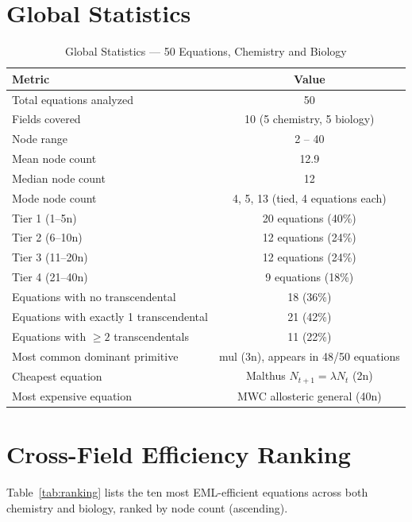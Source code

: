 \documentclass[12pt,a4paper]{article}
\theoremstyle{definition}
\begin{document}
\section{Global Statistics}
\label{sec:stats}

\begin{table}[ht]
\centering
\caption{Global Statistics --- 50 Equations, Chemistry and Biology}
\label{tab:stats}
\begin{tabular}{lc}
\toprule
\textbf{Metric} & \textbf{Value} \\
\midrule
Total equations analyzed & 50 \\
Fields covered & 10 (5 chemistry, 5 biology) \\
Node range & 2 -- 40 \\
Mean node count & 12.9 \\
Median node count & 12 \\
Mode node count & 4, 5, 13 (tied, 4 equations each) \\
Tier 1 (1--5n) & 20 equations (40\%) \\
Tier 2 (6--10n) & 12 equations (24\%) \\
Tier 3 (11--20n) & 12 equations (24\%) \\
Tier 4 (21--40n) & 9 equations (18\%) \\
\midrule
Equations with no transcendental & 18 (36\%) \\
Equations with exactly 1 transcendental & 21 (42\%) \\
Equations with $\geq 2$ transcendentals & 11 (22\%) \\
\midrule
Most common dominant primitive & mul (3n), appears in 48/50 equations \\
Cheapest equation & Malthus $N_{t+1}=\lambda N_t$ (2n) \\
Most expensive equation & MWC allosteric general (40n) \\
\bottomrule
\end{tabular}
\end{table}

\section{Cross-Field Efficiency Ranking}
\label{sec:ranking}

Table~\ref{tab:ranking} lists the ten most EML-efficient equations
across both chemistry and biology, ranked by node count (ascending).
\end{document}
